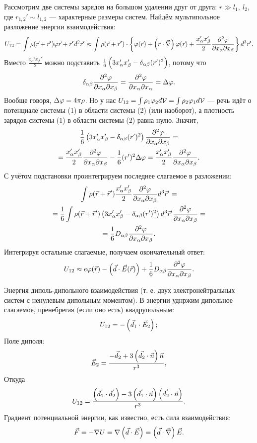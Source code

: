    Рассмотрим две системы зарядов на большом удалении друг от друга: $r \gg l_1, \: l_2$, где $r_{1,2}' \sim l_{1,2}$ --- характерные размеры систем.
    Найдём мультипольное разложение энергии взаимодействия:
    \begin{gather*}
        U_{12} = \int\rho(\vec{r} + \vec{r}')\varphi{\vec{r} + \vec{r}'}d^2\vec{r}' \approx
        \int\rho(\vec{r} + \vec{r}') \cdot \left\{{\varphi(\vec{r}) + \left({\vec{r}\cdot\vec{\nabla}}\right) \varphi(\vec{r}) + \frac{x_{\alpha}'x_{\beta}'}{2} \frac{\partial^2\varphi}{\partial x_{\alpha}\partial x_{\beta}}}\right\} d^3\vec{r}'.
    \end{gather*}
    Вместо $\frac{x_{\alpha}'x_{\beta}'}{2}$ можно подставить $\frac 16 \left({3x_{\alpha}'x_{\beta}' - \delta_{\alpha\beta}(r')^2}\right)$, потому что
    \[
        \delta_{\alpha\beta}\frac{\partial^2\varphi}{\partial x_{\alpha}\partial x_{\beta}} = \frac{\partial^2\varphi}{\partial x_{\alpha}\partial x_{\alpha}} = \Delta\varphi.
    \]
    Вообще говоря, $\Delta\varphi = 4\pi\rho$. Но у нас $U_{12} = \int\rho_1\varphi_2 d\mathcal{V} = \int\rho_2\varphi_1 d\mathcal{V}$ --- речь идёт о потенциале системы (1) в области системы (2) (или наоборот),
    а плотность зарядов системы (1) в области системы (2) равна нулю. Значит,
    \begin{gather*}
        \frac 16 \left({3x_{\alpha}'x_{\beta}' - \delta_{\alpha\beta}(r')^2}\right) \frac{\partial^2\varphi}{\partial x_{\alpha}\partial x_{\beta}} = \\
        = \frac{x_{\alpha}'x_{\beta}'}{2} \frac{\partial^2\varphi}{\partial x_{\alpha}\partial x_{\beta}} - \frac 16 (r')^2 \Delta\varphi = \frac{x_{\alpha}'x_{\beta}'}{2} \frac{\partial^2\varphi}{\partial x_{\alpha}\partial x_{\beta}}.
    \end{gather*}
    С учётом подстановки проинтегрируем последнее слагаемое в разложении:
    \begin{gather*}
        \int \rho(\vec{r} + \vec{r}') \frac{x_{\alpha}'x_{\beta}'}{2} \frac{\partial^2\varphi}{\partial x_{\alpha}\partial x_{\beta}} d^3\vec{r}' = \\
        = \frac 16\int \rho(\vec{r} + \vec{r}') \left({3x_{\alpha}'x_{\beta}' - \delta_{\alpha\beta}(r')^2}\right) d^3\vec{r}' \frac{\partial^2\varphi}{\partial x_{\alpha}\partial x_{\beta}} = \\
        = \frac 16 D_{\alpha\beta} \frac{\partial^2\varphi}{\partial x_{\alpha}\partial x_{\beta}}.
    \end{gather*}
    Интегрируя остальные слагаемые, получаем окончательный ответ:
    \[
        U_{12} \approx e\varphi(\vec{r}) - \left({\vec{d}\cdot\vec{E}(\vec{r})}\right) + \frac 16 D_{\alpha\beta} \frac{\partial^2\varphi}{\partial x_{\alpha}\partial x_{\beta}}.
    \]

    \begin{example} Энергия диполь-дипольного взаимодействия 
        (т. е. двух электронейтральных систем с ненулевым дипольным моментом). В энергии уднржим дипольное слагаемое,
        пренебрегая (если оно есть) квадрупольным:
        \[
            U_{12} = - \left({\vec{d}_1 \cdot \vec{E}_2}\right);
        \]
        Поле диполя:
        \[
            \vec{E}_2 = \frac{-\vec{d}_2 + 3\left({\vec{d_2}\cdot\vec{n}}\right)\vec{n}}{r^3},
        \]
        Откуда
        \[
            U_{12} = \frac{\left({\vec{d_1}\cdot\vec{d_2}}\right) - 3\left({\vec{d_1}\cdot\vec{n}}\right)\left({\vec{d_2}\cdot\vec{n}}\right)}{r^3}.
        \]
        Градиент потенциальной энергии, как известно, есть сила взаимодействия:
        \[
            \vec{F} = -\nabla U = \nabla\left({\vec{d}\cdot\vec{E}}\right) = \left({\vec{d}\cdot\vec{\nabla}}\right)\vec{E}.
        \]
    \end{example}

